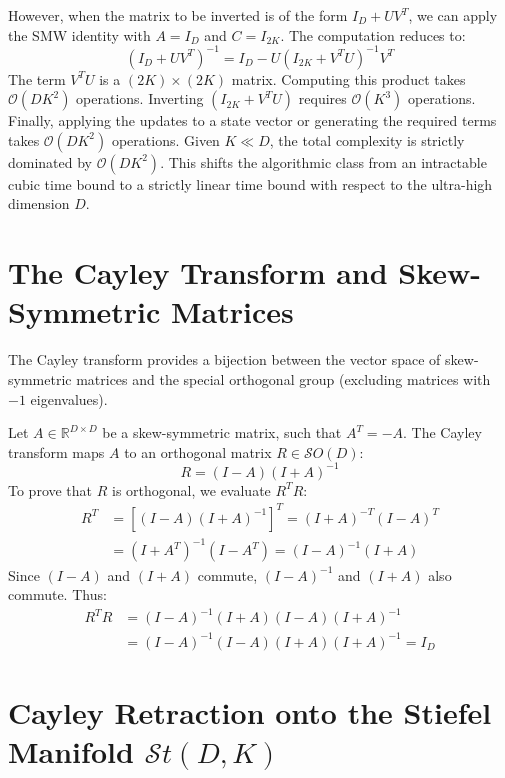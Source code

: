 However, when the matrix to be inverted is of the form $I_D + UV^T$, we can apply the SMW identity with $A = I_D$ and $C = I_{2K}$. The computation reduces to:
\begin{equation}
(I_D + UV^T)^{-1} = I_D - U(I_{2K} + V^T U)^{-1} V^T
\end{equation}
The term $V^T U$ is a $(2K) \times (2K)$ matrix. Computing this product takes $\mathcal{O}(DK^2)$ operations. Inverting $(I_{2K} + V^T U)$ requires $\mathcal{O}(K^3)$ operations. Finally, applying the updates to a state vector or generating the required terms takes $\mathcal{O}(DK^2)$ operations. Given $K \ll D$, the total complexity is strictly dominated by $\mathcal{O}(DK^2)$. This shifts the algorithmic class from an intractable cubic time bound to a strictly linear time bound with respect to the ultra-high dimension $D$.

\section{The Cayley Transform and Skew-Symmetric Matrices}

The Cayley transform provides a bijection between the vector space of skew-symmetric matrices and the special orthogonal group (excluding matrices with $-1$ eigenvalues).

Let $A \in \mathbb{R}^{D \times D}$ be a skew-symmetric matrix, such that $A^T = -A$. The Cayley transform maps $A$ to an orthogonal matrix $R \in \mathcal{S}O(D)$:
\begin{equation}
R = (I - A)(I + A)^{-1}
\end{equation}
To prove that $R$ is orthogonal, we evaluate $R^T R$:
\begin{align*}
R^T &= \left[ (I - A)(I + A)^{-1} \right]^T = (I + A)^{-T} (I - A)^T \\
&= (I + A^T)^{-1} (I - A^T) = (I - A)^{-1} (I + A)
\end{align*}
Since $(I-A)$ and $(I+A)$ commute, $(I-A)^{-1}$ and $(I+A)$ also commute. Thus:
\begin{align*}
R^T R &= (I - A)^{-1} (I + A) (I - A) (I + A)^{-1} \\
&= (I - A)^{-1} (I - A) (I + A) (I + A)^{-1} = I_D
\end{align*}

\section{Cayley Retraction onto the Stiefel Manifold $\mathcal{S}t(D,K)$}

